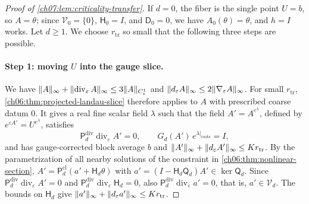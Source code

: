 \begin{proof}[Proof of \cref{ch07:lem:criticality-transfer}]
If $d=0$, the fiber is the single point $U=b$, so $A=\theta$; since $\mathcal V_0=\{0\}$, $\mathsf H_0=I$, and $\mathsf D_0=0$, we have $A_0(\theta)=\theta$, and $h=I$ works. Let $d\ge1$. We choose $r_{\mathrm{tr}}$ so small that the following three steps are possible.

\paragraph{Step 1: moving $U$ into the gauge slice.}
We have $\lVert A\rVert_\infty+\lVert \operatorname{div}_\varepsilon A\rVert_\infty\le3\lVert A\rVert_{C^1_\varepsilon}$ and $\lVert d_\varepsilon A\rVert_\infty\le2\lVert \nabla_\varepsilon A\rVert_\infty$. For small $r_{\mathrm{tr}}$, \cref{ch06:thm:projected-landau-slice} therefore applies to $A$ with prescribed coarse datum $0$. It gives a real fine scalar field $\lambda$ such that the field $A'=A^{e^\lambda}$, defined by $e^{\varepsilon A'}=U^{e^\lambda}$, satisfies
\[
 \mathsf P_d^{\mathrm{div}}\operatorname{div}_\varepsilon A'=0,\qquad G_d(A')\,e^{\lambda|_{\mathrm{roots}}}=I,
\]
and has gauge-corrected block average $b$ and $\lVert A'\rVert_\infty+\lVert d_\varepsilon A'\rVert_\infty\le Kr_{\mathrm{tr}}$. By the parametrization of all nearby solutions of the constraint in \cref{ch06:thm:nonlinear-section}, $A'=\mathsf P_d^{\mathrm{cl}}(a'+\mathsf H_d\theta)$ with $a'=(I-\mathsf H_d\mathsf Q_d)A'\in\ker\mathsf Q_d$. Since $\mathsf P_d^{\mathrm{div}}\operatorname{div}_\varepsilon A'=0$ and $\mathsf P_d^{\mathrm{div}}\operatorname{div}_\varepsilon\mathsf H_d=0$, also $\mathsf P_d^{\mathrm{div}}\operatorname{div}_\varepsilon a'=0$, that is, $a'\in\mathcal V_d$. The bounds on $\mathsf H_d$ give $\lVert a'\rVert_\infty+\lVert d_\varepsilon a'\rVert_\infty\le Kr_{\mathrm{tr}}$.


\end{proof}
